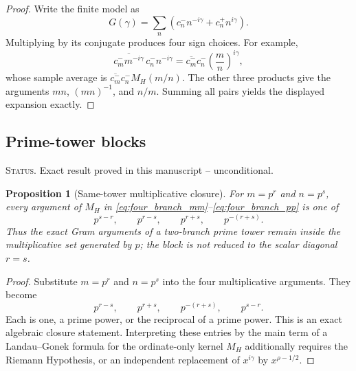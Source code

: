 \documentclass[11pt]{amsart}
\numberwithin{equation}{section}
\theoremstyle{plain}
\newtheorem{proposition}[theorem]{Proposition}
\theoremstyle{definition}
\theoremstyle{remark}
\newcommand{\1}{\mathbf{1}}
\newcommand{\statusnote}[1]{%
  \par\smallskip\noindent
  \begingroup\footnotesize\textsc{Status.} #1\endgroup
  \par\smallskip}
\begin{document}
\begin{proof}
Write the finite model as
\begin{equation}
G(\gamma)
=
\sum_n\left(c_n^-n^{-i\gamma}+c_n^+n^{i\gamma}\right).
\label{eq:four_branch_G_definition}
\end{equation}
Multiplying by its conjugate produces four sign choices.  For example,
\begin{equation}
\overline{c_m^-m^{-i\gamma}}\,c_n^-n^{-i\gamma}
=
\overline{c_m^-}c_n^-
\left(\frac mn\right)^{i\gamma},
\label{eq:four_branch_minus_minus}
\end{equation}
whose sample average is
\(\overline{c_m^-}c_n^-M_H(m/n)\).  The other three products give the
arguments \(mn\), \((mn)^{-1}\), and \(n/m\).  Summing all pairs yields
the displayed expansion exactly.
\end{proof}

\subsection{Prime-tower blocks}
\label{subsec:prime_tower_blocks}

\statusnote{Exact result proved in this manuscript -- unconditional.}
\begin{proposition}[Same-tower multiplicative closure]
\label{prop:same_tower_resonance}
For $m=p^r$ and $n=p^s$, every argument of $M_H$ in
\eqref{eq:four_branch_mm}--\eqref{eq:four_branch_pp} is one of
\begin{equation}
p^{s-r},
\qquad
p^{r-s},
\qquad
p^{r+s},
\qquad
p^{-(r+s)}.
\label{eq:same_tower_arguments}
\end{equation}
Thus the exact Gram arguments of a two-branch prime tower remain inside
the multiplicative set generated by \(p\); the block is not reduced to the
scalar diagonal \(r=s\).
\end{proposition}

\begin{proof}
Substitute \(m=p^r\) and \(n=p^s\) into the four multiplicative arguments.
They become
\begin{equation}
p^{r-s},
\qquad
p^{r+s},
\qquad
p^{-(r+s)},
\qquad
p^{s-r}.
\label{eq:same_tower_arguments_proof}
\end{equation}
Each is one, a prime power, or the reciprocal of a prime power.  This is
an exact algebraic closure statement.  Interpreting these entries by the
main term of a Landau--Gonek formula for the ordinate-only kernel
\(M_H\) additionally requires the Riemann Hypothesis, or an independent
replacement of \(x^{i\gamma}\) by \(x^{\rho-1/2}\).
\end{proof}
\end{document}
